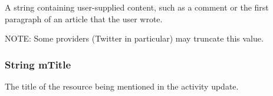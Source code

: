 \label{classcom_1_1janrain_1_1android_1_1engage_1_1types_1_1_j_r_activity_object_ae94df254bffa6663d441027d7d8275c0}
A string containing user-\/supplied content, such as a comment or the first paragraph of an article that the user wrote.

NOTE: Some providers (Twitter in particular) may truncate this value. \hypertarget{classcom_1_1janrain_1_1android_1_1engage_1_1types_1_1_j_r_activity_object_a6a07e9575c466f0cfeb02907ae8d0973}{
\subsubsection[{mTitle}]{\setlength{\rightskip}{0pt plus 5cm}String {\bf mTitle}}}
\label{classcom_1_1janrain_1_1android_1_1engage_1_1types_1_1_j_r_activity_object_a6a07e9575c466f0cfeb02907ae8d0973}
The title of the resource being mentioned in the activity update.


